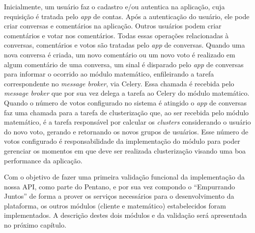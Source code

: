 	Inicialmente, um usuário faz o cadastro e/ou autentica na aplicação,
	cuja requisição é tratada pelo \textit{app} de contas.
	Após a autenticação do usuário, ele pode criar conversas e comentários na aplicação.
	Outros usuários podem criar comentários e votar nos comentários.
	Todas essas operações relacionadas à conversas, comentários e votos
	são tratadas pelo \textit{app} de conversas.
	Quando uma nova conversa é criada, um novo comentário ou um novo voto é realizado
	em algum comentário de uma conversa, um sinal é disparado pelo \textit{app} de conversas
	para informar o ocorrido ao módulo matemático, enfileirando a tarefa correspondente
	no \textit{message broker}, via Celery.
	Essa chamada é recebida pelo \textit{message broker} que por sua vez delega
	a tarefa ao Celery do módulo matemático.
	Quando o número de votos configurado no sistema é atingido o \textit{app} de conversas
	faz uma chamada para a tarefa de clusterização que, ao ser recebida pelo módulo matemático,
	é a tarefa responsável por calcular os \textit{clusters} considerando o usuário do novo voto,
	gerando e retornando os novos grupos de usuários. Esse número de votos configurado é responsabilidade
	da implementação do módulo para poder gerenciar os momentos em que deve ser realizada clusterização visando 
	uma boa performance da aplicação.
	
	
	Com o objetivo de fazer uma primeira validação funcional 
	da implementação da nossa API, como parte do Pentano, e
	por sua vez compondo o ``Empurrando Juntos'' de forma a prover os serviços necessários para 
	o desenvolvimento da plataforma, os outros módulos (cliente e matemático) 
	estabelecidos foram implementados. A descrição destes dois módulos e da validação será apresentada no próximo
	capítulo.
	
	